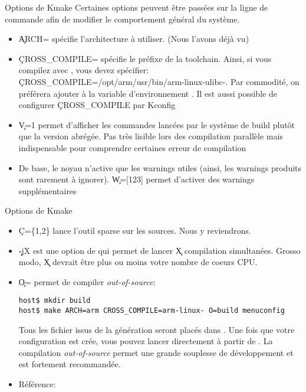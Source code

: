\begin{frame}[fragile=singleslide]{Options de Kmake}
  Certaines options peuvent être passées sur la ligne de commande afin
  de modifier le comportement général du système.
  \begin{itemize}
  \item  \c{ARCH=} spécifie l'architecture  à utiliser.  (Nous l'avons
    déjà vu)
  \item \c{CROSS_COMPILE=} spécifie le préfixe de la toolchain. Ainsi,
    si vous  compilez avec ,
    vous                        devez                       spécifier:
    \c{CROSS_COMPILE=/opt/arm/usr/bin/arm-linux-ulibc-}.            Par
    commodité,  on  préférera   ajouter    à  la
    variable  d'environnement  .  Il  est aussi  possible  de
    configurer \c{CROSS_COMPILE} par Kconfig
  \item \c{V=1} permet d'afficher les commandes lancées par le système
    de build plutôt que la  version abrégée. Pas très lisible lors des
    compilation parallèle mais indispensable pour comprendre certaines
    erreur de compilation
  \item De base, le noyau n'active que les warnings utiles (ainsi, les
    warnings  produits sont rarement  à ignorer).   \c{W=[123]} permet
    d'activer des warnings supplémentaires
\end{itemize} 
\end{frame} 

\begin{frame}[fragile=singleslide]{Options de Kmake}
\begin{itemize} 
  \item  \c{C=\{1,2\}} lance  l'outil  sparse sur  les  sources. Nous  y
    reviendrons.
  \item  \c{-jX} est  une option  de   qui permet  de lancer
    \c{X}  compilation simultanées.  Grosso modo,  \c{X}  devrait être
    plus ou moins votre nombre de coeurs CPU.
  \item \c{O=} permet de compiler \emph{out-of-source}:
    \begin{lstlisting}
host$ mkdir build
host$ make ARCH=arm CROSS_COMPILE=arm-linux- O=build menuconfig
    \end{lstlisting} %
    Tous  les  fichier  issus  de  la génération  seront  placés  dans
    .  Une fois  que  votre configuration  est crée,  vous
    pouvez lancer  directement  à partir de . La
    compilation  \emph{out-of-source} permet  une grande  souplesse de
    développement et est fortement recommandée.
  \item Référence: 
  \end{itemize} 
\end{frame}

